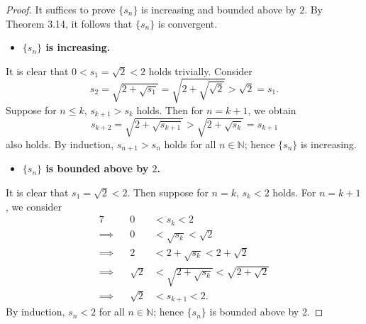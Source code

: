 \begin{Exercise}
	\begin{proof}
		It suffices to prove $\{s_n\}$ is increasing and bounded above by $2$. By Theorem 3.14, it follows that $\{s_n\}$ is convergent.
		
		\begin{itemize}
			\item \textbf{$\{s_n\}$ is increasing.}
		\end{itemize}
		It is clear that $0<s_1=\sqrt{2}<2$ holds trivially.
		Consider
		$$
		s_2 = \sqrt{2+\sqrt{s_1}} = \sqrt{2+\sqrt{\sqrt{2}}} > \sqrt{2} = s_1.
		$$
		Suppose for $n\leq k$, $s_{k+1}>s_k$ holds. Then for $n = k+1$, we obtain
		$$
		s_{k+2} = \sqrt{2+\sqrt{s_{k+1}}} > \sqrt{2+\sqrt{s_k}} = s_{k+1}
		$$
		also holds. By induction, $s_{n+1}>s_n$ holds for all $n\in\mathbb{N}$; hence $\{s_n\}$ is increasing.
		
		\begin{itemize}
			\item \textbf{$\{s_n\}$ is bounded above by $2$.}
		\end{itemize}
		It is clear that $s_1 = \sqrt{2} < 2$. Then suppose for $n=k$, $s_k < 2$ holds. For $n=k+1$, we consider
		\begin{alignat*}{7}
		\quad&& 0 &<s_k<2 \\
		\implies&& 0 &< \sqrt{s_k} < \sqrt{2} \\
		\implies&& 2 &< 2+\sqrt{s_k} < 2+\sqrt{2} \\
		\implies&& \sqrt{2} &< \sqrt{2+\sqrt{s_k}} < \sqrt{2+\sqrt{2}} \\
		\implies&& \sqrt{2} &< s_{k+1} < 2.
		\end{alignat*}
		By induction, $s_n<2$ for all $n\in\mathbb{N}$; hence $\{s_n\}$ is bounded above by 2.
	\end{proof}
\end{Exercise}